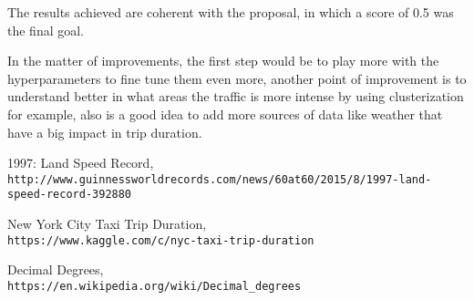 \documentclass[11pt]{article}
\begin{document}
The results achieved are coherent with the proposal, in which a score of
0.5 was the final goal.

In the matter of improvements, the first step would be to play more with
the hyperparameters to fine tune them even more, another point of
improvement is to understand better in what areas the traffic is more
intense by using clusterization for example, also is a good idea to add
more sources of data like weather that have a big impact in trip
duration.

\begin{thebibliography}{1}
1997: Land Speed Record,
\\\texttt{http://www.guinnessworldrecords.com/news/60at60/2015/8/1997-land-speed-record-392880}

New York City Taxi Trip Duration,
\\\texttt{https://www.kaggle.com/c/nyc-taxi-trip-duration}

Decimal Degrees,
\\\texttt{https://en.wikipedia.org/wiki/Decimal\_degrees}


\end{thebibliography}
\end{document}

